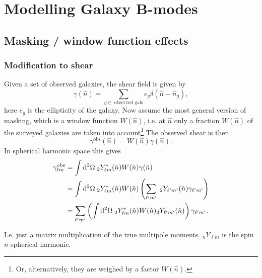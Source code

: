 \documentclass[11pt]{book}
\DeclareRobustCommand{\d}{\ifmmode\text{d}\else d\fi}
\newcommand{\br}[1]{\ensuremath{\left( #1 \right)}}
\begin{document}
\chapter{Modelling Galaxy B-modes}
\section{Masking / window function effects}
\subsection{Modification to shear}
Given a set of observed galaxies, the shear field is given by
\begin{equation}
	\gamma(\hat n)=\sum_{g\in\text{ observed gals}} e_g \delta(\hat n - \hat n_g),
\end{equation}
here $e_g$ is the ellipticity of the galaxy. Now assume the most general version of masking, which is a window function $W(\hat n)$, i.e. at $\hat n$ only a fraction $W(\hat n)$ of the surveyed galaxies are taken into account\footnote{Or, alternatively, they are weighed by a factor $W(\hat n)$.} The observed shear is then
\begin{equation}
	\gamma^{\text{obs}}(\hat n) = W(\hat n)\gamma(\hat n).
\end{equation}
In spherical harmonic space this gives
\begin{align}
	\gamma_{\ell m}^{\text{obs}} &= \int \d^2\Omega \; _2Y_{\ell m}^*(\hat n)W(\hat n)\gamma(\hat n)\\
	&= \int \d^2\Omega \; _2Y_{\ell m}^*(\hat n)W(\hat n)\br{\sum_{\ell' m'} \;_2Y_{\ell'm'}(\hat n)\gamma_{\ell'm'}}\\
	&= \sum_{\ell' m'} \br{\int \d^2\Omega \; _2Y_{\ell m}^*(\hat n)W(\hat n)_2Y_{\ell'm'}(\hat n)} \gamma_{\ell'm'}. \label{eq:windowedshearfunc}
\end{align}

I.e. just a matrix multiplication of the true multipole moments. $_nY_{\ell m}$ is the spin $n$ spherical harmonic.
\end{document}
